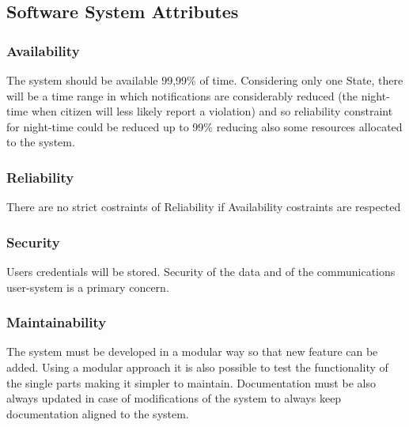 \subsection{Software System Attributes}
\subsubsection{Availability}
The system should be available 99,99\% of time. Considering only one State, there will be a time range 
in which notifications are considerably reduced (the night-time when citizen will less likely report 
a violation) and so reliability constraint for night-time could be reduced up to 99\% reducing also some 
resources allocated to the system.
\subsubsection{Reliability}
There are no strict costraints of Reliability if Availability costraints are respected
\subsubsection{Security}

Users credentials will be stored. Security of the data and of the communications user-system is a primary concern.

\subsubsection {Maintainability}
The system must be developed in a modular way so that new feature can be added.
Using a modular approach it is also possible to test the functionality of the single parts making it simpler to maintain.
Documentation must be also always updated in case of modifications of the system to always keep documentation aligned to the system.
